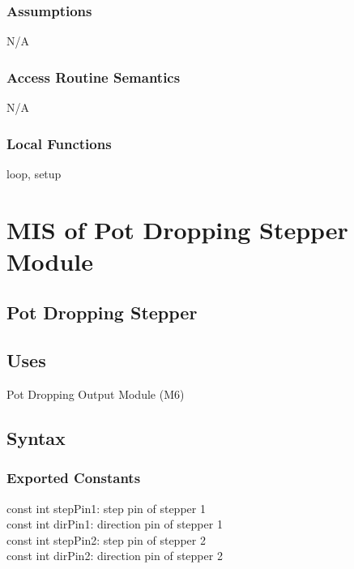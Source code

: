 \documentclass[12pt, titlepage]{article}
\begin{document}
\subsubsection{Assumptions}

N/A

\subsubsection{Access Routine Semantics}

N/A




\subsubsection{Local Functions}

loop, setup

\section{MIS of Pot Dropping Stepper Module} \label{potdroppingstepper} 

\subsection{Pot Dropping Stepper}

\subsection{Uses}
Pot Dropping Output Module (M6) 

\subsection{Syntax}

\subsubsection{Exported Constants}
const int stepPin1: step pin of stepper 1\\
const int dirPin1: direction pin of stepper 1\\
const int stepPin2: step pin of stepper 2\\
const int dirPin2: direction pin of stepper 2\\
\end{document}
